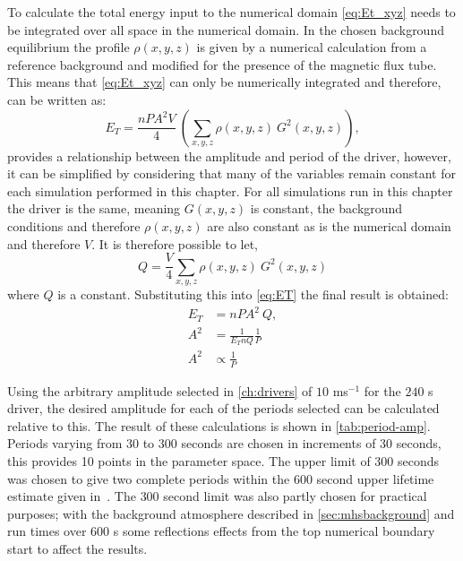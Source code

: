 \documentclass[a4paper,12pt,fourier,authoryear,custommargin]{Classes/PhDThesisPSnPDF}
\begin{document}
To calculate the total energy input to the numerical domain \cref{eq:Et_xyz} needs to be integrated over all space in the numerical domain.
In the chosen background equilibrium the profile $\rho(x,y,z)$ is given by a numerical calculation from a reference background and modified for the presence of the magnetic flux tube.
This means that \cref{eq:Et_xyz} can only be numerically integrated and therefore, can be written as:
\begin{equation}
    E_T = \frac{nPA^2V}{4}\ \left( \sum_{x,y,z} \rho(x,y,z)\ G^2(x,y,z) \right),\label{eq:ET}
\end{equation}
 provides a relationship between the amplitude and period of the driver, however, it can be simplified by considering that many of the variables remain constant for each simulation performed in this chapter.
For all simulations run in this chapter the driver is the same, meaning $G(x,y,z)$ is constant, the background conditions and therefore $\rho(x,y,z)$ are also constant as is the numerical domain and therefore $V$.
It is therefore possible to let,
\begin{equation}
    Q = \frac{V}{4} \sum_{x,y,z} \rho(x,y,z)\ G^2(x,y,z)
\end{equation}
where $Q$ is a constant.
Substituting this into \cref{eq:ET} the final result is obtained:
\begin{align}
    E_T &= nPA^2\ Q, \\
    A^2 &= \frac{1}{E_T n Q} \frac{1}{P} \\
    A^2 &\propto \frac{1}{P}
\end{align}

Using the arbitrary amplitude selected in \cref{ch:drivers} of $10$ ms$^{-1}$ for the $240$ s driver, the desired amplitude for each of the periods selected can be calculated relative to this.
The result of these calculations is shown in \cref{tab:period-amp}.
Periods varying from $30$ to $300$ seconds are chosen in increments of $30$ seconds, this provides 10 points in the parameter space.
The upper limit of $300$ seconds was chosen to give two complete periods within the $600$ second upper lifetime estimate given in~\cite{sanchezalmeida2004}.
The $300$ second limit was also partly chosen for practical purposes; with the background atmosphere described in \cref{sec:mhsbackground} and run times over $600$ s some reflections effects from the top numerical boundary start to affect the results.
\end{document}
